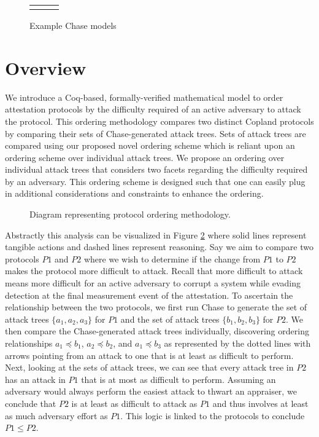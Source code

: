 \documentclass[runningheads]{llncs}
\theoremstyle{definition}
\begin{document}
\begin{figure}[hbtp]
    \centering 
    \begin{tabular}{m{3cm} m{3cm} m{3cm}}
         &  &  
    \end{tabular}
    \caption[Example Chase Models]{Example Chase models}
    \label{fig:chase-ex}
\end{figure}




\section{Overview}
We introduce a Coq-based, formally-verified mathematical model to order attestation protocols by the difficulty required of an active adversary to attack the protocol. This ordering methodology compares two distinct Copland protocols by comparing their sets of Chase-generated attack trees. Sets of attack trees are compared using our proposed novel ordering scheme which is reliant upon an ordering scheme over individual attack trees. We propose an ordering over individual attack trees that considers two facets regarding the difficulty required by an adversary. This ordering scheme is designed such that one can easily plug in additional considerations and constraints to enhance the ordering.

\begin{figure}[hbtp]
    \centering
    \captionsetup{justification=centering,margin=1cm}
    
    \caption[Protocol ordering abstraction]{Diagram representing protocol ordering methodology. }
    \label{fig:protocol-org-fig}
\end{figure}

Abstractly this analysis can be visualized in Figure \ref{fig:protocol-org-fig} where solid lines represent tangible actions and dashed lines represent reasoning. Say we aim to compare two protocols $P1$ and $P2$ where we wish to determine if the change from $P1$ to $P2$ makes the protocol more difficult to attack. Recall that more difficult to attack means more difficult for an active adversary to corrupt a system while evading detection at the final measurement event of the attestation. To ascertain the relationship between the two protocols, we first run Chase to generate the set of attack trees $\{ a_1, a_2, a_3\}$ for $P1$ and the set of attack trees $\{b_1, b_2, b_3\}$ for $P2$. We then compare the Chase-generated attack trees individually, discovering ordering relationships $a_1 \preceq b_1$, $a_2 \preceq b_2$, and $a_1 \preceq b_3$ as represented by the dotted lines with arrows pointing from an attack to one that is at least as difficult to perform. Next, looking at the sets of attack trees, we can see that every attack tree in $P2$ has an attack in $P1$ that is at most as difficult to perform. Assuming an adversary would always perform the easiest attack to thwart an appraiser, we conclude that $P2$ is at least as difficult to attack as $P1$ and thus involves at least as much adversary effort as $P1$. This logic is linked to the protocols to conclude $P1 \leq P2$.  
\end{document}

